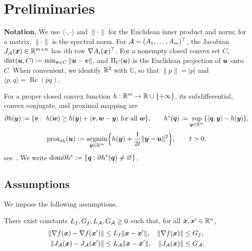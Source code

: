 \section{Preliminaries}
\label{sec:preliminaries}
\textbf{Notation.} We use $\langle\cdot,\cdot\rangle$ and $\|\cdot\|$ for the
Euclidean inner product and norm; for a matrix, $\|\cdot\|$ is the spectral
norm. For $\mathcal{A}=(A_1,\ldots,A_m)^\top$, the Jacobian
$J_{\mathcal{A}}(\bm{x})\in\mathbb{R}^{m\times n}$ has $i$th row $\nabla A_i(\bm{x})^\top$. For a
nonempty closed convex set $C$, $\operatorname{dist}(\bm{u},C):=\min_{\bm{v}\in C}\|\bm{u}-\bm{v}\|$, and
$\Pi_C(\bm{u})$ is the Euclidean projection of $\bm{u}$ onto $C$. When convenient, we
identify $\mathbb{R}^2$ with $\mathbb C$, so that $\|p\|=|p|$ and
$\langle p,q\rangle=\operatorname{Re}(\bar pq)$.

For a proper closed convex function \(h:\mathbb{R}^m\to\mathbb{R}\cup\{+\infty\}\), its
subdifferential, convex conjugate, and proximal mapping are
\[
    \partial h(\bm{y}):=\{\bm{v}:\ h(\bm{w})\ge h(\bm{y})+\langle\bm{v},\bm{w}-\bm{y}\rangle
    \ \text{for all }\bm{w}\},
    \qquad
    h^*(\bm{q}):=\sup_{\bm{y}\in\mathbb{R}^m}\{\langle\bm{q},\bm{y}\rangle-h(\bm{y})\},
\]
\begin{equation}
    \mathrm{prox}_{t h}(\bm{u})
    :=\operatorname*{\mathrm{argmin}}_{\bm{y}\in\mathbb{R}^m}
       \Bigl\{h(\bm{y})+\frac{1}{2t}\|\bm{y}-\bm{u}\|^2\Bigr\},
    \qquad t>0;
    \label{eq:prox-definition}
\end{equation}
see~\cite{rockafellar1970convex}. We write
\(\mathrm{dom}\partial h^*:=\{\bm{q}:\partial h^*(\bm{q})\neq\varnothing\}\).


\subsection{Assumptions}
\label{sec:assumptions}
We impose the following assumptions.
\begin{assumption}
\label{ass:smoothness}
There exist constants $L_f,G_f,L_{\mathcal{A}},G_{\mathcal{A}}\ge0$ such that, for
all $\bm{x},\bm{x}'\in\mathbb{R}^n$,
\[
\begin{aligned}
    \|\nabla f(\bm{x})-\nabla f(\bm{x}')\|
    &\le L_f\|\bm{x}-\bm{x}'\|,
    &\|\nabla f(\bm{x})\|&\le G_f,\\
    \|J_{\mathcal{A}}(\bm{x})-J_{\mathcal{A}}(\bm{x}')\|
    &\le L_{\mathcal{A}}\|\bm{x}-\bm{x}'\|,
    &\|J_{\mathcal{A}}(\bm{x})\|&\le G_{\mathcal{A}}.
\end{aligned}
\]
\end{assumption}

